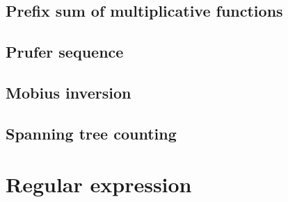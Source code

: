 \documentclass[UTF8,a4paper]{report}
\begin{document}
			\subsection{Prefix sum of multiplicative functions}
				
			\subsection{Prufer sequence}
				
			\subsection{Mobius inversion}
				
			\subsection{Spanning tree counting}
				
		\section{Regular expression}
				
			
\end{document}
